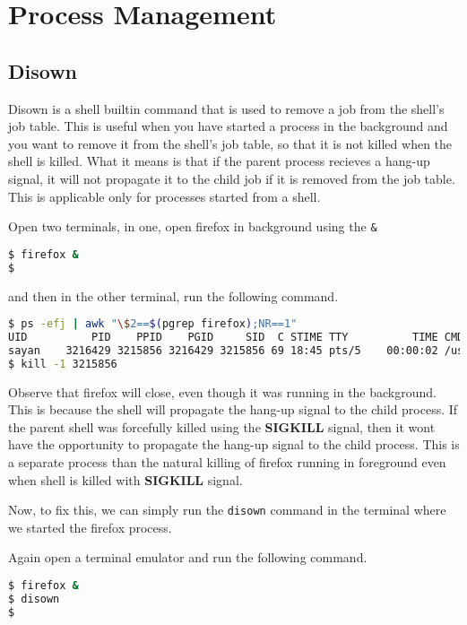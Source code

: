 \vfill
\pagebreak
\section{Process Management}
\subsection{Disown}

Disown is a shell builtin command that is used to remove a job from the shell's
job table. This is useful when you have started a process in the background
and you want to remove it from the shell's job table, so that it is not
killed when the shell is killed. What it means is that if the parent
process recieves a hang-up signal, it will not propagate it to the child
job if it is removed from the job table.
This is applicable only for processes started from a shell.

Open two terminals, in one, open firefox in background using the \lstinline|&|

\begin{lstlisting}[language=bash]
$ firefox &
$
\end{lstlisting}

and then in the other terminal, run the following command.

\begin{lstlisting}[language=bash]
$ ps -efj | awk "\$2==$(pgrep firefox);NR==1"
UID          PID    PPID    PGID     SID  C STIME TTY          TIME CMD
sayan    3216429 3215856 3216429 3215856 69 18:45 pts/5    00:00:02 /usr/lib/firefox/firefox
$ kill -1 3215856
\end{lstlisting}

Observe that firefox will close, even though it was running in the background.
This is because the shell will propagate the hang-up signal to the child process.
If the parent shell was forcefully killed using the \textbf{SIGKILL} signal,
then it wont have the opportunity to propagate the hang-up signal to the child process.
This is a separate process than the natural killing of firefox running in
foreground even when shell is killed with \textbf{SIGKILL} signal.

Now, to fix this, we can simply run the \lstinline|disown| command in the terminal
where we started the firefox process.

Again open a terminal emulator and run the following command.

\begin{lstlisting}[language=bash]
$ firefox &
$ disown
$
\end{lstlisting}

